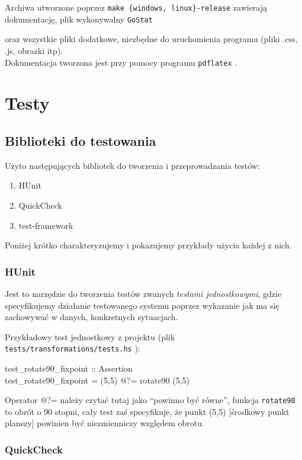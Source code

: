 \documentclass[10pt,leqno]{article}
\newcommand{\cmd}[1]{
  \texttt{#1}
}
\begin{document}
\noindent Archiwa utworzone poprzez \cmd{make \{windows, linux\}-release} zawierają dokumentację, plik wykonywalny \cmd{GoStat}
oraz wszystkie pliki dodatkowe, niezbędne do uruchomienia programu (pliki .css, .js, obrazki itp). \\

\noindent Dokumentacja tworzona jest przy pomocy programu \cmd{pdflatex}.

\newpage

\section{Testy}

\subsection{Biblioteki do testowania}

Użyto następujących bibliotek do tworzenia i przeprowadzania testów:

\begin{enumerate}
\item HUnit
\item QuickCheck
\item test-framework
\end{enumerate}

\noindent Poniżej krótko charakteryzujemy i pokazujemy przykłady użycia każdej z nich.

\subsubsection{HUnit}
Jest to narzędzie do tworzenia testów zwanych \emph{testami jednostkowymi}, gdzie 
specyfikujemy działanie testowanego systemu poprzez wykazanie jak ma się zachowywać w
danych, konkretnych sytuacjach.

Przykładowy test jednostkowy z projektu (plik \cmd{tests/transformations/tests.hs}):

\begin{framed}
\noindent test\_rotate90\_fixpoint :: Assertion \\
test\_rotate90\_fixpoint = (5,5) @?= rotate90 (5,5)
\end{framed}

Operator @?= należy czytać tutaj jako ``powinno być równe'', funkcja \cmd{rotate90} to
obrót o 90 stopni, cały test zaś specyfikuje, że punkt (5,5) [środkowy punkt planszy]
powinien być niezmienniczy względem obrotu.

\subsubsection{QuickCheck}
\end{document}
